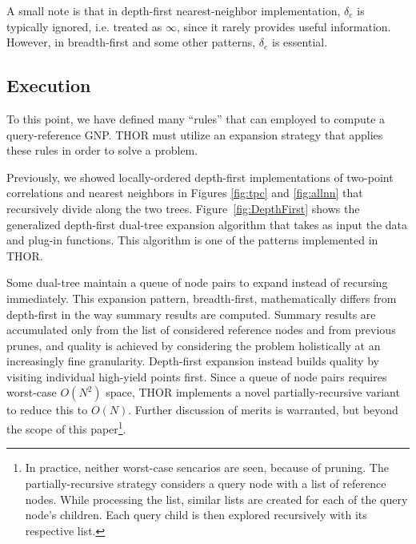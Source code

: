 \documentclass[twoside,leqno,twocolumn]{article}
\newcommand{\summary}{\delta}
\newcommand{\fig}[1]{Figure~\ref{fig:#1}}
\newcommand{\lettermu}{e}
\newcommand{\deltamu}{\summary_{\lettermu}}
\begin{document}
\noindent A small note is that in depth-first nearest-neighbor implementation, $\deltamu$ is typically ignored, i.e. treated as $\infty$, since it rarely provides useful information.
However, in breadth-first and some other patterns, $\deltamu$ is essential.

\subsection{Execution}

To this point, we have defined many ``rules'' that can employed to compute a query-reference GNP.
THOR must utilize an expansion strategy that applies these rules in order to solve a problem.

Previously, we showed locally-ordered depth-first implementations of two-point correlations and nearest neighbors in Figures \ref{fig:tpc} and \ref{fig:allnn} that recursively divide along the two trees.
\fig{DepthFirst} shows the generalized depth-first dual-tree expansion algorithm that takes as input the data and plug-in functions.
This algorithm is one of the patterns implemented in THOR.

Some dual-tree maintain a queue of node pairs to expand instead of recursing immediately.
This expansion pattern, breadth-first, mathematically differs from depth-first in the way summary results are computed.
Summary results are accumulated only from the list of considered reference nodes and from previous prunes, and quality is achieved by considering the problem holistically at an increasingly fine granularity.
Depth-first expansion instead builds quality by visiting individual high-yield points first.
Since a queue of node pairs requires worst-case $O(N^2)$ space, THOR implements a novel partially-recursive variant to reduce this to $O(N)$.
Further discussion of merits is warranted, but beyond the scope of this paper\footnote{
  In practice, neither worst-case sencarios are seen, because of pruning.
  The partially-recursive strategy considers a query node with a list of reference nodes.
  While processing the list, similar lists are created for each of the query node's children.
  Each query child is then explored recursively with its respective list.}.
\end{document}
